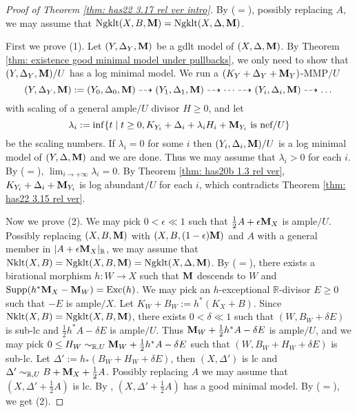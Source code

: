 \documentclass[11pt]{amsart}
\numberwithin{equation}{section}
\newcommand{\Mm}{{\bf{M}}}
\newcommand{\Rr}{\mathbb{R}}
\newcommand{\Exc}{\operatorname{Exc}}
\newcommand{\Nklt}{\operatorname{Nklt}}
\newcommand{\Supp}{\operatorname{Supp}}
\newcommand{\Ngklt}{\operatorname{Ngklt}}
\theoremstyle{definition}
\theoremstyle{definition}
\theoremstyle{definition}
\begin{document}
\begin{proof}[Proof of Theorem \ref{thm: has22 3.17 rel ver intro}]
By \cite[Lemma 4.3]{HL21} ($=$\cite[Version 3, Lemma 4.2]{HL21}), possibly replacing $A$, we may assume that $\Ngklt(X,B,\Mm)=\Ngklt(X,\Delta,\Mm)$.

First we prove (1). Let $(Y,\Delta_Y,\Mm)$ be a gdlt model of $(X,\Delta,\Mm)$. By Theorem \ref{thm: existence good minimal model under pullbacks}, we only need to show that $(Y,\Delta_Y,\Mm)/U$ has a log minimal model. We run a $(K_Y+\Delta_Y+\Mm_Y)$-MMP$/U$ 
$$(Y,\Delta_Y,\Mm):=(Y_0,\Delta_0,\Mm)\dashrightarrow(Y_1,\Delta_1,\Mm)\dashrightarrow\dots\dashrightarrow (Y_i,\Delta_i,\Mm)\dashrightarrow\dots$$
with scaling of a general ample$/U$ divisor $H\geq 0$, and let
$$\lambda_i:=\inf\{t\mid t\geq 0, K_{Y_i}+\Delta_i+\lambda_iH_i+\Mm_{Y_i}\text{ is nef}/U\}$$
be the scaling numbers. If $\lambda_i=0$ for some $i$ then $(Y_i,\Delta_i,\Mm)/U$ is a log minimal model of $(Y,\Delta,\Mm)$ and we are done. Thus we may assume that $\lambda_i>0$ for each $i$. By \cite[Theorem 2.8]{HL21} ($=$\cite[Version 3, Theorem 2.24]{HL21}), $\lim_{i\rightarrow+\infty}\lambda_i=0$. By Theorem \ref{thm: has20b 1.3 rel ver}, $K_{Y_i}+\Delta_i+\Mm_{Y_i}$ is log abundant$/U$ for each $i$, which contradicts Theorem \ref{thm: has22 3.15 rel ver}.

Now we prove (2). We may pick $0<\epsilon\ll 1$ such that $\frac{1}{2}A+\epsilon\Mm_X$ is ample$/U$. Possibly replacing $(X,B,\Mm)$ with $(X,B,(1-\epsilon)\Mm)$ and $A$ with a general member in $|A+\epsilon\Mm_X|_{\Rr}$, we may assume that $\Nklt(X,B)=\Ngklt(X,B,\Mm)=\Ngklt(X,\Delta,\Mm)$. By \cite[Lemma 5.9]{HL21} ($=$\cite[Version 3, Lemma 5.18]{HL21}), there exists a birational morphism $h: W\rightarrow X$ such that $\Mm$ descends to $W$ and $\Supp(h^*\Mm_X-\Mm_W)=\Exc(h)$. We may pick an $h$-exceptional $\Rr$-divisor $E\geq 0$ such that $-E$ is ample$/X$. Let $K_W+B_W:=h^*(K_X+B)$. Since $\Nklt(X,B)=\Ngklt(X,B,\Mm)$, there exists $0<\delta\ll 1$ such that $(W,B_W+\delta E)$ is sub-lc and $\frac{1}{2}h^*A-\delta E$ is ample$/U$. Thus $\Mm_W+\frac{1}{2}h^*A-\delta E$ is ample$/U$, and we may pick $0\leq H_W\sim_{\Rr,U}\Mm_W+\frac{1}{2}h^*A-\delta E$ such that $(W,B_W+H_W+\delta E)$ is sub-lc. Let $\Delta':=h_*(B_W+H_W+\delta E)$, then $(X,\Delta')$ is lc and $\Delta'\sim_{\Rr,U}B+\Mm_X+\frac{1}{2}A$. Possibly replacing $A$ we may assume that $(X,\Delta'+\frac{1}{2}A)$ is lc. By \cite[Theorem 1.5]{HH20},  $(X,\Delta'+\frac{1}{2}A)$ has a good minimal model. By \cite[Lemma 4.3]{HL21} ($=$\cite[Version 3, Lemma 4.2]{HL21}), we get (2).
\end{proof}
\end{document}
